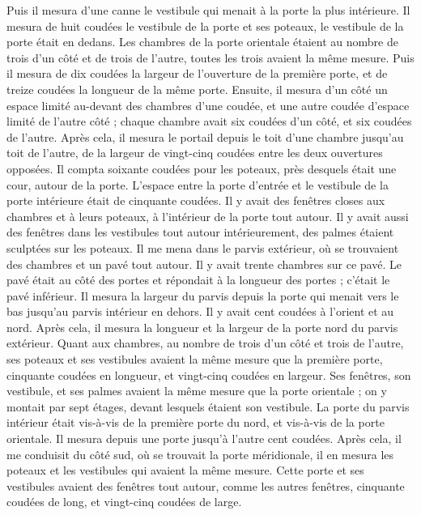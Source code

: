 \begin{multicols}{2}
Puis il mesura d'une canne le vestibule qui menait à la porte la plus intérieure.
Il mesura de huit coudées le vestibule de la porte et ses poteaux, le vestibule de la porte était en dedans.
Les chambres de la porte orientale étaient au nombre de trois d'un côté et de trois de l'autre, toutes les trois avaient la même mesure.
Puis il mesura de dix coudées la largeur de l'ouverture de la première porte, et de treize coudées la longueur de la même porte.
Ensuite, il mesura d'un côté un espace limité au-devant des chambres d'une coudée, et une autre coudée d'espace limité de l'autre côté ; chaque chambre avait six coudées d'un côté, et six coudées de l'autre.
Après cela, il mesura le portail depuis le toit d'une chambre jusqu'au toit de l'autre, de la largeur de vingt-cinq coudées entre les deux ouvertures opposées.
Il compta soixante coudées pour les poteaux, près desquels était une cour, autour de la porte.
L'espace entre la porte d'entrée et le vestibule de la porte intérieure était de cinquante coudées.
Il y avait des fenêtres closes aux chambres et à leurs poteaux, à l'intérieur de la porte tout autour. Il y avait aussi des fenêtres dans les vestibules tout autour intérieurement, des palmes étaient sculptées sur les poteaux.
Il me mena dans le parvis extérieur, où se trouvaient des chambres et un pavé tout autour. Il y avait trente chambres sur ce pavé.
Le pavé était au côté des portes et répondait à la longueur des portes ; c'était le pavé inférieur.
Il mesura la largeur du parvis depuis la porte qui menait vers le bas jusqu'au parvis intérieur en dehors. Il y avait cent coudées à l'orient et au nord.
Après cela, il mesura la longueur et la largeur de la porte nord du parvis extérieur.
Quant aux chambres, au nombre de trois d'un côté et trois de l'autre, ses poteaux et ses vestibules avaient la même mesure que la première porte, cinquante coudées en longueur, et vingt-cinq coudées en largeur.
Ses fenêtres, son vestibule, et ses palmes avaient la même mesure que la porte orientale ; on y montait par sept étages, devant lesquels étaient son vestibule.
La porte du parvis intérieur était vis-à-vis de la première porte du nord, et vis-à-vis de la porte orientale. Il mesura depuis une porte jusqu'à l'autre cent coudées.
Après cela, il me conduisit du côté sud, où se trouvait la porte méridionale, il en mesura les poteaux et les vestibules qui avaient la même mesure.
Cette porte et ses vestibules avaient des fenêtres tout autour, comme les autres fenêtres, cinquante coudées de long, et vingt-cinq coudées de large.

\end{multicols}
